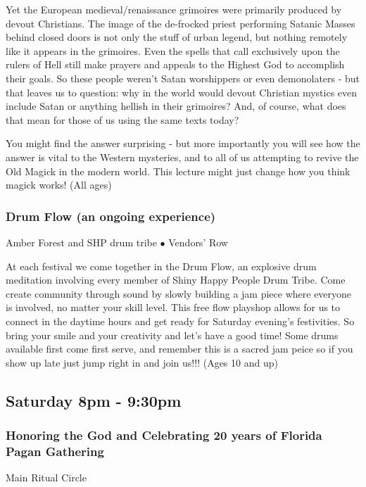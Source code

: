 Yet the European medieval/renaissance grimoires were primarily produced by devout Christians.  The image of the de-frocked priest performing Satanic Masses behind closed doors is not only the stuff of urban legend, but nothing remotely like it appears in the grimoires. Even the spells that call exclusively upon the rulers of Hell still make prayers and appeals to the Highest God to accomplish their goals.  So these people weren't Satan worshippers or even demonolaters - but that leaves us to question:  why in the world would devout Christian mystics even include Satan or anything hellish in their grimoires?  And, of course, what does that mean for those of us using the same texts today?

You might find the answer surprising - but more importantly you will see how the answer is vital to the Western mysteries, and to all of us attempting to revive the Old Magick in the modern world.  This lecture might just change how you think magick works! {\small (All ages)}

\subsubsection{Drum Flow (an ongoing experience)}
\label{Sat-Shiny1}
{\small Amber Forest and SHP drum tribe $\bullet$  Vendors' Row}

 At each festival we come together in the Drum Flow, an explosive drum meditation involving every member of Shiny Happy People Drum Tribe. Come create community through sound by slowly building a jam piece where everyone is involved, no matter your skill level. This free flow playshop allows for us to connect in the daytime hours and get ready for Saturday evening's festivities. So bring your smile and your creativity and let's have a good time! Some drums available first come first serve, and remember this is a sacred jam peice so if you show up late just jump right in and join us!!! {\small (Ages 10 and up)}

\subsection{Saturday 8pm - 9:30pm}

\subsubsection{Honoring the God and Celebrating 20 years of Florida Pagan Gathering}
\label{Sat-RITUAL}
{\small  Main Ritual Circle}

